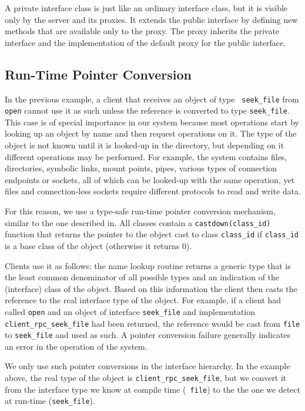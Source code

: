 A private interface class is just like an ordinary interface class,
but it is visible only by the server and its proxies. It extends the
public interface by defining new methods that are available only to
the proxy. The proxy inherits the private interface and the
implementation of the default proxy for the public interface.

\subsection{Run-Time Pointer Conversion}

In the previous example, a client that receives an object of type {\tt
seek\_file} from {\tt open} cannot use it as such unless the reference
is converted to type {\tt seek\_file}. This case is of
special importance in our system because most operations start by
looking up an object by name and then request operations on it. The
type of the object is not known until it is looked-up in the
directory, but depending on it different operations may be performed.
For example, the system contains files, directories, symbolic links,
mount points, pipes, various types of connection endpoints or sockets,
all of which can be looked-up with the same operation, yet files and
connection-less sockets require different protocols to read and write
data.

For this reason, we use a type-safe run-time pointer conversion mechanism,
similar to the one described in\cite{gorlen}. All classes contain a
{\tt castdown(class\_id)} function that returns the pointer to the object
cast to class {\tt class\_id} if {\tt class\_id} is a base class of
the object (otherwise it returns 0).

Clients use it as follows: the name lookup routine returns a generic
type that is the least common denominator of all possible types and an
indication of the (interface) class of the object. Based on this
information the client then casts the reference to the real interface
type of the object. For example, if a client had called {\tt open} and
an object of interface {\tt seek\_file} and implementation {\tt
client\_rpc\_seek\_file} had been returned, the reference would be
cast from {\tt file} to {\tt seek\_file} and used as such. A pointer
conversion failure generally indicates an error in the operation of
the system. 

We only use such pointer conversions in the interface hierarchy. In
the example above, the
real type of the object is {\tt client\_rpc\_seek\_file}, but we
convert it from the interface type we know at compile time ({\tt
file}) to the the one we detect at run-time ({\tt seek\_file}).

